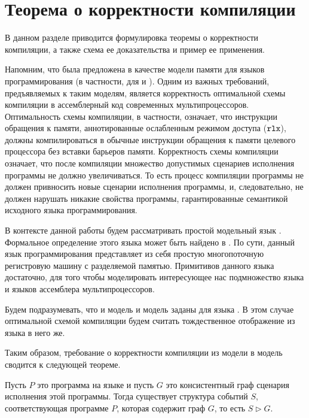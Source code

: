 \pagebreak

\section{Теорема о корректности компиляции}

В данном разделе приводится формулировка теоремы о
корректности компиляции, а также схема ее доказательства
и пример ее применения.

Напомним, что \Wkm была предложена в качестве модели памяти
для языков программирования (в частности, для \CPP и \LLVMIR).
Одним из важных требований, предъявляемых к таким моделям,
является корректность оптимальной схемы компиляции
в ассемблерный код современных мультипроцессоров.
Оптимальность схемы компиляции, в частности,
означает, что инструкции обращения к памяти,
аннотированные ослабленным режимом доступа ($\mathtt{rlx}$),
должны компилироваться в обычные инструкции обращения к
памяти целевого процессора без вставки барьеров памяти.
Корректность схемы компиляции означает, что после
компиляции множество допустимых сценариев исполнения программы
не должно увеличиваться. То есть процесс компиляции программы
не должен привносить новые сценарии исполнения программы,
и, следовательно, не должен нарушать никакие свойства программы,
гарантированные семантикой исходного языка программирования.

В контексте данной работы будем рассматривать
простой модельный язык \LLANG.
Формальное определение этого языка может быть
найдено в \cite[Рис.2]{Podkopaev-al:POPL19}.
По сути, данный язык программирования представляет
из себя простую многопоточную регистровую машину
с разделяемой памятью.
Примитивов данного языка достаточно,
для того чтобы моделировать интересующее
нас подмножество языка \CPP и языков ассемблера мультипроцессоров.

Будем подразумевать, что и модель \Wkm
и модель \IMM заданы для языка \LLANG.
В этом случае оптимальной схемой компиляции будем считать
тождественное отображение из языка \LLANG в него же.

Таким образом, требование о корректности компиляции
из модели \Wkm в модель \IMM сводится к следующей теореме. 

\begin{theorem}
  \label{thm:main}
  Пусть $P$ это программа на языке \LLANG
  и пусть $G$ это \IMM консистентный граф сценария исполнения этой программы.
  Тогда существует структура событий $S$, соответствующая программе $P$,
  которая содержит граф $G$, то есть $S \rhd G$.
\end{theorem}

